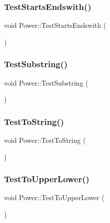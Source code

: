 \mbox{\label{namespace_power_a8624c60b65b1b0f8859122599816d25b}} 
\subsubsection{\texorpdfstring{Test\+Starts\+Endswith()}{TestStartsEndswith()}}
{\footnotesize\ttfamily void Power\+::\+Test\+Starts\+Endswith (\begin{DoxyParamCaption}{ }\end{DoxyParamCaption})}

\mbox{\label{namespace_power_a15f3bf497eb9f54378f0e2b590802bd4}} 
\subsubsection{\texorpdfstring{Test\+Substring()}{TestSubstring()}}
{\footnotesize\ttfamily void Power\+::\+Test\+Substring (\begin{DoxyParamCaption}{ }\end{DoxyParamCaption})}

\mbox{\label{namespace_power_a089aad37a74a89e886f605a3ea478664}} 
\subsubsection{\texorpdfstring{Test\+To\+String()}{TestToString()}}
{\footnotesize\ttfamily void Power\+::\+Test\+To\+String (\begin{DoxyParamCaption}{ }\end{DoxyParamCaption})}

\mbox{\label{namespace_power_a8fab005f68597905871a451bac70eb1d}} 
\subsubsection{\texorpdfstring{Test\+To\+Upper\+Lower()}{TestToUpperLower()}}
{\footnotesize\ttfamily void Power\+::\+Test\+To\+Upper\+Lower (\begin{DoxyParamCaption}{ }\end{DoxyParamCaption})}


